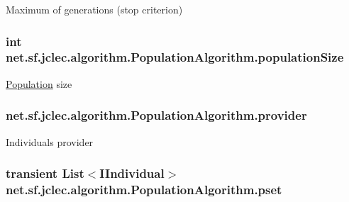 Maximum of generations (stop criterion) \hypertarget{classnet_1_1sf_1_1jclec_1_1algorithm_1_1_population_algorithm_a1657216babb573a20a02a0e8d0d70a9d}{
\subsubsection[{population\-Size}]{\setlength{\rightskip}{0pt plus 5cm}int net.\-sf.\-jclec.\-algorithm.\-Population\-Algorithm.\-population\-Size\hspace{0.3cm}{\ttfamily [protected]}}}\label{classnet_1_1sf_1_1jclec_1_1algorithm_1_1_population_algorithm_a1657216babb573a20a02a0e8d0d70a9d}
\hyperlink{classnet_1_1sf_1_1jclec_1_1_population}{Population} size \hypertarget{classnet_1_1sf_1_1jclec_1_1algorithm_1_1_population_algorithm_ae306ca51282d20b86295d5b6879150ed}{
\subsubsection[{provider}]{ net.\-sf.\-jclec.\-algorithm.\-Population\-Algorithm.\-provider\hspace{0.3cm}{\ttfamily [protected]}}}\label{classnet_1_1sf_1_1jclec_1_1algorithm_1_1_population_algorithm_ae306ca51282d20b86295d5b6879150ed}
Individuals provider \hypertarget{classnet_1_1sf_1_1jclec_1_1algorithm_1_1_population_algorithm_ab7e03cdd4f7119decd159e125dfbcc31}{
\subsubsection[{pset}]{\setlength{\rightskip}{0pt plus 5cm}transient List$<${\bf I\-Individual}$>$ net.\-sf.\-jclec.\-algorithm.\-Population\-Algorithm.\-pset\hspace{0.3cm}{\ttfamily [protected]}}}\label{classnet_1_1sf_1_1jclec_1_1algorithm_1_1_population_algorithm_ab7e03cdd4f7119decd159e125dfbcc31}
